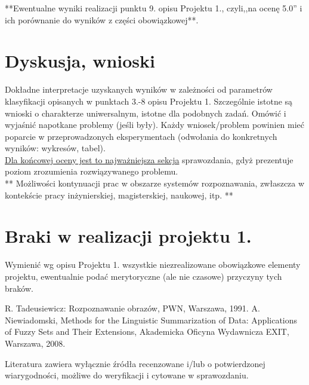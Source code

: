 \documentclass{classrep}
\begin{document}
{**Ewentualne wyniki realizacji punktu 9. opisu Projektu 1., czyli,,na ocenę 5.0'' i ich porównanie do wyników z
części obowiązkowej**.}\\



\section{Dyskusja, wnioski}
Dokładne interpretacje uzyskanych wyników w zależności od parametrów klasyfikacji
opisanych w punktach 3.-8 opisu Projektu 1. 
Szczególnie istotne są wnioski o charakterze uniwersalnym, istotne dla podobnych zadań. 
Omówić i wyjaśnić napotkane problemy (jeśli były). Każdy wniosek/problem powinien mieć poparcie
w przeprowadzonych eksperymentach (odwołania do konkretnych wyników: wykresów,
tabel). \\
\underline{Dla końcowej oceny jest to najważniejsza sekcja} sprawozdania, gdyż prezentuje poziom
zrozumienia rozwiązywanego problemu.\\

** Możliwości kontynuacji prac w obszarze systemów rozpoznawania, zwłaszcza w kontekście pracy inżynierskiej,
magisterskiej, naukowej, itp. **\\



\section{Braki w realizacji projektu 1.}
Wymienić wg opisu Projektu 1. wszystkie niezrealizowane obowiązkowe elementy projektu, ewentualnie
podać merytoryczne (ale nie czasowe) przyczyny tych braków. 


\begin{thebibliography}{0}
 R. Tadeusiewicz: Rozpoznawanie obrazów, PWN, Warszawa, 1991.  
 A. Niewiadomski, Methods for the Linguistic Summarization of Data: Applications of Fuzzy Sets and Their Extensions, Akademicka Oficyna Wydawnicza EXIT, Warszawa, 2008.
\end{thebibliography}

Literatura zawiera wyłącznie źródła recenzowane i/lub o potwierdzonej wiarygodności,
możliwe do weryfikacji i cytowane w sprawozdaniu. 
\end{document}
